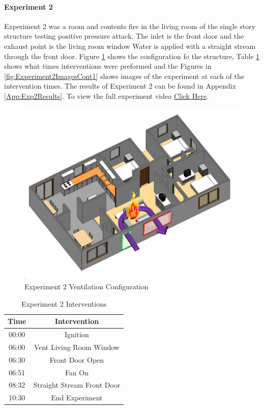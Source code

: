 \documentclass{article}
\begin{document}
\paragraph{Experiment 2}\mbox{}

Experiment 2 was a room and contents fire in the living room of the single story structure testing positive pressure attack. The inlet is the front door and the exhaust point is the living room window Water is applied with a straight stream through the front door. Figure \ref{fig:Exp2VentConfig} shows the configuration fo the structure, Table \ref{Table:Exp2Interventions} shows what times interventions were preformed and the Figures in \ref{fig:Experiment2ImagesCont1} shows images of the experiment at each of the intervention times. The results of Experiment 2 can be found in Appendix \ref{App:Exp2Results}. To view the full experiment video \href{https://youtu.be/B-GvQX4JoAc}{Click Here}.

\begin{figure}[H]
	\centering
	\includegraphics[width=5in]{0_Images/FireExperiments/Single_Story/Experiment_2.jpg}
	\caption{Experiment 2 Ventilation Configuration}
	\label{fig:Exp2VentConfig}
\end{figure}

\begin{table}[H]
	\centering
	\caption{Experiment 2 Interventions}
	\begin{tabular}{|c|c|} 
		\hline
		Time & Intervention \\ \hline \hline
		00:00 & Ignition \\ \hline
		06:00 & Vent Living Room Window\\ \hline
		06:30 & Front Door Open \\ \hline
		06:51 & Fan On \\ \hline
		08:32 & Straight Stream Front Door \\ \hline
		10:30 & End Experiment \\ \hline
	\end{tabular}
	\label{Table:Exp2Interventions}
\end{table}
\end{document}
